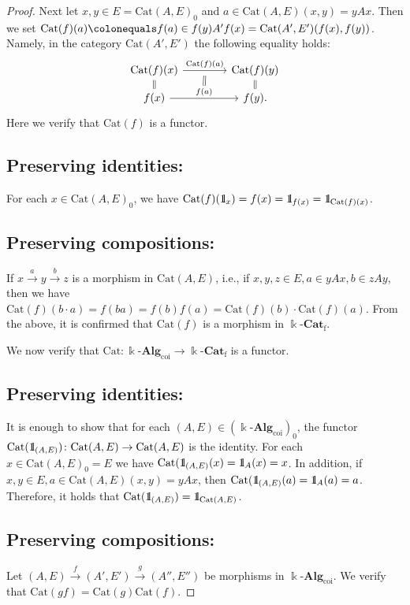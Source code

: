 \documentclass{surv-l}
\numberwithin{equation}{chapter}
\numberwithin{figure}{chapter}
\theoremstyle{plain}
\theoremstyle{definition}
\theoremstyle{remark}
\newcommand{\id}{1\kern-.25em{\text{{\rm l}}}}
\newcommand{\kCat}{\Bbbk\text{-}\mathbf{Cat}}
\newcommand{\Ar}[3]{\ar[from={#1}, to={#2}, #3]}
\begin{document}
\begin{proof}
Next let $x,y \in E = \mathrm{Cat}(A,E)_0$ and $a \in \mathrm{Cat}(A,E)(x,y) = yAx$.
Then we set
$\mathrm{Cat}(f)(a)\colonequals  f(a) \in f(y)A'f(x) = \mathrm{Cat}(A',E')(f(x), f(y))$.
Namely, in the category $\mathrm{Cat}(A',E')$ the following equality holds:
\[
\begin{tikzcd}[column sep=40]
\mathrm{Cat}(f)(x) & \mathrm{Cat}(f)(y)\\[-10pt]
f(x) & f(y).
\Ar{1-1}{1-2}{"\mathrm{Cat}(f)(a)", ""' name=a}
\Ar{2-1}{2-2}{"f(a)" name=b}
\Ar{1-1}{2-1}{equal}
\Ar{1-2}{2-2}{equal}
\Ar{a}{b}{equal}
\end{tikzcd}
\]
Here we verify that $\mathrm{Cat}(f)$ is a functor.


\subsection*{Preserving identities:}
For each $x \in \mathrm{Cat}(A,E)_0$,
we have $\mathrm{Cat}(f)(\id_x) = f(x) = \id_{f(x)} = \id_{\mathrm{Cat}(f)(x)}$.


\subsection*{Preserving compositions:}
If $x \xrightarrow{a} y \xrightarrow{b} z$ is a morphism in $\mathrm{Cat}(A,E)$, i.e., if
$x,y,z \in E, a \in yAx, b \in zAy$, then we have
$\mathrm{Cat}(f)(b\cdot a) = f(ba) = f(b)f(a) = \mathrm{Cat}(f)(b)\cdot\mathrm{Cat}(f)(a)$.
From the above, it is confirmed that $\mathrm{Cat}(f)$ is a morphism in $\kCat_{\mathrm{f}}$.

\medskip
We now verify that $\mathrm{Cat} \colon \Bbbk\text{-}\mathbf{Alg}_{\mathrm{coi}} \to \kCat_{\mathrm{f}}$ is a functor.

\subsection*{Preserving identities:}
It is enough to show that for each $(A,E) \!\in\! (\Bbbk\text{-}\mathbf{Alg}_{\mathrm{coi}})_0$,
the functor $\mathrm{Cat}(\id_{(A,E)}) \colon \mathrm{Cat}(A,E) \to \mathrm{Cat}(A,E)$ is the identity.
For each $x \in \mathrm{Cat}(A,E)_0 = E$ we have
$\mathrm{Cat}(\id_{(A,E)}(x) = \id_A(x) = x$.
In addition, if $x,y \in E, a\in \mathrm{Cat}(A,E)(x,y) = yAx$, then
$\mathrm{Cat}(\id_{(A,E)}(a) = \id_A(a) = a$.
Therefore, it holds that $\mathrm{Cat}(\id_{(A,E)}) = \id_{\mathrm{Cat}(A,E)}$.


\subsection*{Preserving compositions:}
Let $(A,E) \xrightarrow{f} (A',E') \xrightarrow{g} (A'', E'')$ be morphisms in $\Bbbk\text{-}\mathbf{Alg}_{\mathrm{coi}}$.
We verify that $\mathrm{Cat}(gf) = \mathrm{Cat}(g) \mathrm{Cat}(f)$.


\end{proof}
\end{document}
